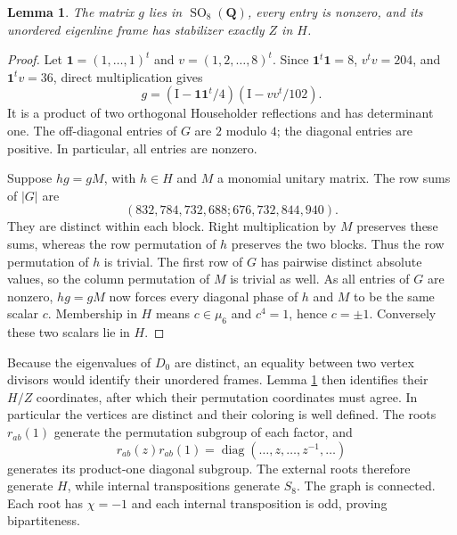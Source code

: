 \documentclass[11pt]{article}
\newtheorem{lemma}[theorem]{Lemma}
\theoremstyle{definition}
\theoremstyle{remark}
\newcommand{\Q}{\mathbf Q}
\newcommand{\Id}{\mathrm I}
\begin{document}
\begin{lemma}\label{eisenstein-trace-lem:frame}
The matrix $g$ lies in $\operatorname{SO}_8(\Q)$, every entry is nonzero,
and its unordered eigenline frame has stabilizer exactly $Z$ in $H$.
\end{lemma}
\begin{proof}
Let $\mathbf1=(1,\ldots,1)^t$ and $v=(1,2,\ldots,8)^t$.
Since $\mathbf1^t\mathbf1=8$, $v^tv=204$, and
$\mathbf1^tv=36$, direct multiplication gives
\[
 g=(\Id-\mathbf1\mathbf1^t/4)(\Id-vv^t/102).
\]
It is a product of two orthogonal Householder reflections and has
determinant one.  The off-diagonal entries of $G$ are $2$ modulo $4$;
the diagonal entries are positive.  In particular, all entries are nonzero.

Suppose $hg=gM$, with $h\in H$ and $M$ a monomial unitary matrix.
The row sums of $|G|$ are
\[
 (832,784,732,688;676,732,844,940).
\]
They are distinct within each block.  Right multiplication by $M$
preserves these sums, whereas the row permutation of $h$ preserves the
two blocks.  Thus the row permutation of $h$ is trivial.  The first
row of $G$ has pairwise distinct absolute values, so the column
permutation of $M$ is trivial as well.  As all entries of $G$ are
nonzero, $hg=gM$ now forces every diagonal phase of $h$ and $M$ to be
the same scalar $c$.  Membership in $H$ means $c\in\mu_6$ and
$c^4=1$, hence $c=\pm1$.  Conversely these two scalars lie in $H$.
\end{proof}

Because the eigenvalues of $D_0$ are distinct, an equality between two
vertex divisors would identify their unordered frames.  Lemma
\ref{eisenstein-trace-lem:frame} then identifies their $H/Z$ coordinates, after which
their permutation coordinates must agree.  In particular the vertices
are distinct and their coloring is well defined.  The roots
$r_{ab}(1)$ generate the permutation subgroup of each factor, and
\[
 r_{ab}(z)r_{ab}(1)=\operatorname{diag}(\ldots,z,\ldots,z^{-1},\ldots)
\]
generates its product-one diagonal subgroup.  The external roots
therefore generate $H$, while internal transpositions generate $S_8$.
The graph is connected.  Each root has $\chi=-1$ and each internal
transposition is odd, proving bipartiteness.
\end{document}
